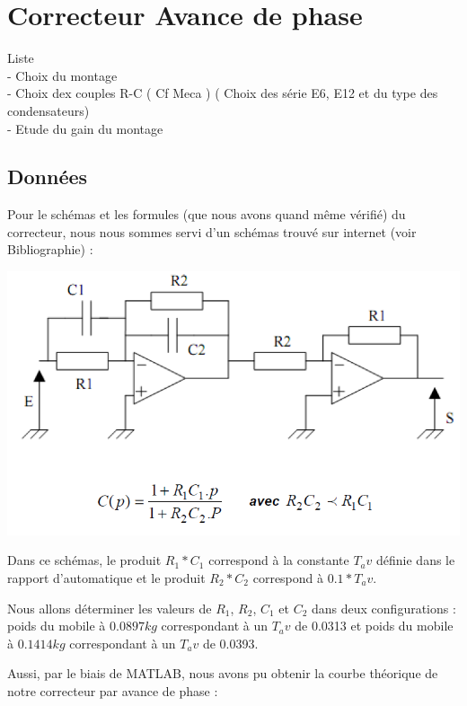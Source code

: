 \documentclass[11pt, french]{article} %
\begin{document}
\section{Correcteur Avance de phase}

Liste
\\- Choix du montage
\\- Choix dex couples R-C ( Cf Meca ) ( Choix des série E6, E12 et du type des condensateurs)
\\- Etude du gain du montage


\subsection{Données}

\noindent
Pour le schémas et les formules (que nous avons quand même vérifié) du correcteur, nous nous sommes servi d'un schémas trouvé sur internet (voir Bibliographie) :

\begin{center}
\includegraphics[width = 15cm]{SolutionAnalogique/Avph.png} 
\end{center}

\vspace{0.5cm}

Dans ce schémas, le produit $R_1*C_1$ correspond à la constante $ T_av$ définie dans le rapport d'automatique et le produit $R_2*C_2$ correspond à $0.1*T_av$.


Nous allons déterminer les valeurs de $R_1$, $R_2$, $C_1$ et $C_2$ dans deux configurations : poids du mobile à $0.0897 kg$ correspondant à un $T_av$ de 0.0313 et poids du mobile à $0.1414 kg$ correspondant à un $T_av$ de 0.0393.


Aussi, par le biais de MATLAB, nous avons pu obtenir la courbe théorique de notre correcteur par avance de phase :
\end{document}

